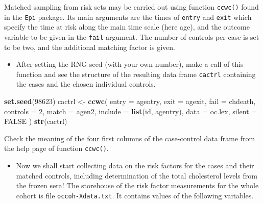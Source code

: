 \documentclass[
]{book}
\newenvironment{Shaded}{\begin{snugshade}}{\end{snugshade}}
\newcommand{\AttributeTok}[1]{\textcolor[rgb]{0.13,0.29,0.53}{#1}}
\newcommand{\ConstantTok}[1]{\textcolor[rgb]{0.56,0.35,0.01}{#1}}
\newcommand{\DecValTok}[1]{\textcolor[rgb]{0.00,0.00,0.81}{#1}}
\newcommand{\FunctionTok}[1]{\textcolor[rgb]{0.13,0.29,0.53}{\textbf{#1}}}
\newcommand{\NormalTok}[1]{#1}
\newcommand{\OtherTok}[1]{\textcolor[rgb]{0.56,0.35,0.01}{#1}}
\providecommand{\tightlist}{%
  \setlength{\itemsep}{0pt}\setlength{\parskip}{0pt}}
\begin{document}
Matched sampling from risk sets may be carried out using
function \texttt{ccwc()} found in the \texttt{Epi} package.
Its main arguments are the times
of \texttt{entry} and \texttt{exit} which specify the time at risk along the
main time scale (here age), and the outcome variable to be given
in the \texttt{fail} argument. The number of controls per case
is set to be two, and the additional matching factor is given.

\begin{itemize}
\tightlist
\item
  After setting the RNG seed (with your own number),
  make a call of this function and see
  the structure of the resulting data frame \texttt{cactrl}
  containing the cases and the chosen individual controls.
\end{itemize}

\begin{Shaded}
\begin{Highlighting}[]
\FunctionTok{set.seed}\NormalTok{(}\DecValTok{98623}\NormalTok{)}
\NormalTok{cactrl }\OtherTok{\textless{}{-}}
  \FunctionTok{ccwc}\NormalTok{(}
    \AttributeTok{entry =}\NormalTok{ agentry, }\AttributeTok{exit =}\NormalTok{ agexit, }\AttributeTok{fail =}\NormalTok{ chdeath,}
    \AttributeTok{controls =} \DecValTok{2}\NormalTok{, }\AttributeTok{match =}\NormalTok{ agen2,}
    \AttributeTok{include =} \FunctionTok{list}\NormalTok{(id, agentry),}
    \AttributeTok{data =}\NormalTok{ oc.lex, }\AttributeTok{silent =} \ConstantTok{FALSE}
\NormalTok{  )}
\FunctionTok{str}\NormalTok{(cactrl)}
\end{Highlighting}
\end{Shaded}

Check the meaning of the four first columns of the case-control
data frame from the help page of function \texttt{ccwc()}.

\begin{itemize}
\tightlist
\item
  Now we shall start collecting data on the
  risk factors for the cases and their
  matched controls, including determination of the total cholesterol
  levels from the frozen sera! The storehouse of the risk factor measurements for
  the whole cohort is file \texttt{occoh-Xdata.txt}. It contains
  values of the following variables.
\end{itemize}
\end{document}
